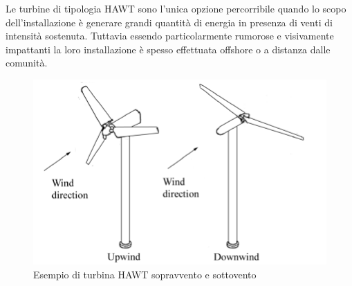 Le turbine di tipologia HAWT sono l'unica opzione percorribile quando lo scopo dell'installazione è generare grandi quantità di energia in presenza di venti di intensità sostenuta.
Tuttavia essendo particolarmente rumorose e visivamente impattanti la loro installazione è spesso effettuata offshore o a distanza dalle comunità.
\begin{figure}[H]
    \centering
    \includegraphics[height=0.3\textwidth]{res/cap 3/HAWT}
    \caption{Esempio di turbina HAWT sopravvento e sottovento}
\end{figure}\noindent
